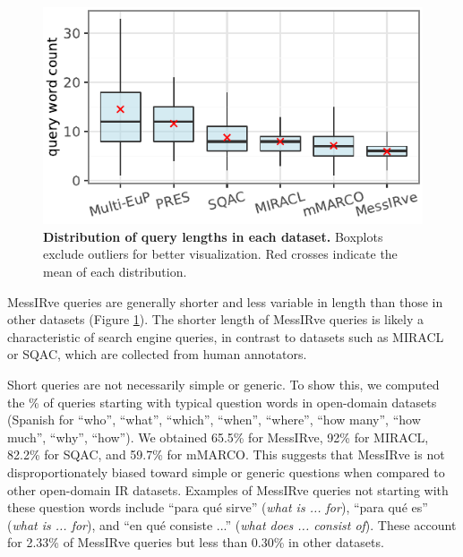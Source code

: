 \documentclass[11pt]{article}
\begin{document}
\begin{figure}[ht]
  \centering
  \includegraphics[width=0.9\columnwidth]{plots/datasets_query_len.pdf}
  \caption{\textbf{Distribution of query lengths in each dataset.}
  Boxplots exclude outliers for better visualization. Red crosses indicate the mean of each distribution.
  }
  \label{fig:datasets_query_len}
\end{figure}


MessIRve queries are generally shorter and less variable in length than those in other datasets (Figure \ref{fig:datasets_query_len}).
The shorter length of MessIRve queries is likely a characteristic of search engine queries, in contrast to datasets such as MIRACL or SQAC, which are collected from human annotators.

Short queries are not necessarily simple or generic. To show this, we computed the \% of queries starting with typical question words in open-domain datasets (Spanish for ``who'', ``what'', ``which'', ``when'', ``where'', ``how many'', ``how much'', ``why'', ``how'').
We obtained 65.5\% for MessIRve, 92\% for MIRACL, 82.2\% for SQAC, and 59.7\% for mMARCO.
This suggests that MessIRve is not disproportionately biased toward simple or generic questions when compared to other open-domain IR datasets.
Examples of MessIRve queries not starting with these question words include ``para qué sirve'' (\emph{what is ... for}), ``para qué es'' (\emph{what is ... for}), and ``en qué consiste ...'' (\emph{what does ... consist of}).
These account for 2.33\% of MessIRve queries but less than 0.30\% in other datasets.
\end{document}
